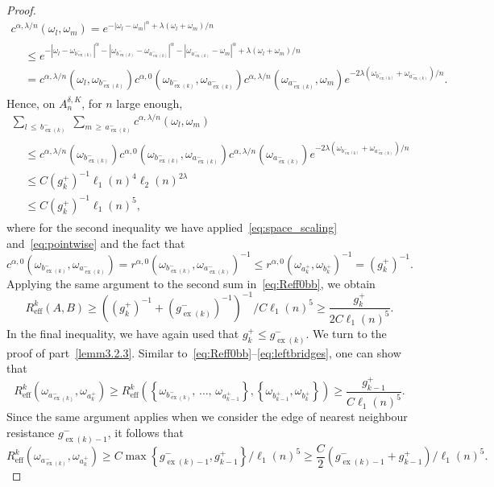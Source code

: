 \documentclass[10pt]{amsart}
\theoremstyle{definition}\newtheorem{defi}[theo]{Definition}\newtheorem{rema}[theo]{Remark}\newtheorem{exam}[theo]{Example}\newtheorem{exem}[theo]{Example}\newtheorem{nota}[theo]{Notation}
\newcommand{\eff}{\mathrm{eff}}
\newcommand\ex{\operatorname{ex}}
\newcommand{\aat}[1]{a_{\ex(#1)}^-}
\newcommand{\bt}[1]{b_{\ex(#1)}^-}
\newcommand{\gt}[1]{g_{\ex(#1)}^-}
\newcommand{\gtt}[1]{g_{\ex(#1)-1}^-}
\begin{document}
\begin{proof}
\begin{multline*}
c^{\alpha,\lambda/n}(\omega_l,\omega_m)
=e^{-|\omega_l-\omega_m|^\alpha+\lambda(\omega_l+\omega_m)/n}\\
\begin{aligned}
&\leq e^{-|\omega_l-\omega_{\bt{k}}|^\alpha-|\omega_{\bt{k}}-\omega_{\aat{k}}|^\alpha-|\omega_{\aat{k}}-\omega_m|^\alpha+\lambda(\omega_l+\omega_m)/n}\\
&=c^{\alpha,\lambda/n}\left(\omega_l,\omega_{\bt{k}}\right)c^{\alpha,0}\left(\omega_{\bt{k}},\omega_{\aat{k}}\right)c^{\alpha,\lambda/n}\left(\omega_{\aat{k}},\omega_m\right)e^{-2\lambda\left(\omega_{\bt{k}}+\omega_{\aat{k}}\right)/n}.
\end{aligned}
\end{multline*}
Hence, on $A_n^{\delta,K}$, for $n$ large enough,
\begin{multline}\label{eq:leftbridges}
{\textstyle \sum_{l\,\leq\,\bt{k}}\;\sum_{m\,\geq\,\aat{k}}}c^{\alpha,\lambda/n}\left(\omega_l,\omega_m\right)\\
\begin{aligned}
&\leq c^{\alpha,\lambda/n}\left(\omega_{\bt{k}}\right)c^{\alpha,0}\left(\omega_{\bt{k}},\omega_{\aat{k}}\right)c^{\alpha,\lambda/n}\left(\omega_{\aat{k}}\right)e^{-2\lambda\left(\omega_{\bt{k}}+\omega_{\aat{k}}\right)/n}\\
&\leq C\left(g_k^+\right)^{-1}\ell_1(n)^4{\ell_2(n)^{2\lambda}}\\
&\leq C\left(g_k^+\right)^{-1}\ell_1(n)^5,
\end{aligned}
\end{multline}
where for the second inequality we have applied~\eqref{eq:space_scaling} and~\eqref{eq:pointwise} and the fact that
\[
c^{\alpha,0}\left(\omega_{\bt{k}},\omega_{\aat{k}}\right)=r^{\alpha,0}\left(\omega_{\bt{k}},\omega_{\aat{k}}\right)^{-1}\leq r^{\alpha,0}\left(\omega_{{a}_k^+},\omega_{{b}_k^+}\right)^{-1}=(g_k^+)^{-1}.
\]
Applying the same argument to the second sum in~\eqref{eq:Reff0bb}, we obtain
\[
R^{k}_{\eff}\left(A,B\right)\ge \left(\left(g_{k}^+\right)^{-1}+\left(\gt{k}\right)^{-1}\right)^{-1}/{C\ell_1(n)^5}\ge \frac{g_{k}^+}{2C\ell_1(n)^5}.
\]
In the final inequality, we have again used that $g_k^+\leq \gt{k}$. We turn to the proof of part~\eqref{lemm3.2.3}. Similar to~\eqref{eq:Reff0bb}--\eqref{eq:leftbridges}, one can show that
\[
R^k_{\eff}\left(\omega_{\aat{k}},{\omega_{a_k^+}}\right)\geq R^k_{\eff}\left(
\left\{\omega_{\bt{k}},\,\dots,\,\omega_{{a}_{k-1}^+}\right\},\left\{\omega_{b_{k-1}^+},\omega_{b_k^+}\right\}\right)\geq \frac{g_{k-1}^+}{C\ell_1(n)^5}.
\]
Since the same argument applies when we consider the edge of nearest neighbour resistance $\gtt{k}$, it follows that
\[
R^k_{\eff}\left(\omega_{\aat{k}},{\omega_{a_k^+}}\right)\geq C \max
\left\{\gtt{k},g_{k-1}^+\right\}/\ell_1(n)^5\geq \frac C2 \left(\gtt{k}+g_{k-1}^+\right)/ \ell_1(n)^5.
\]
\end{proof}
\end{document}
